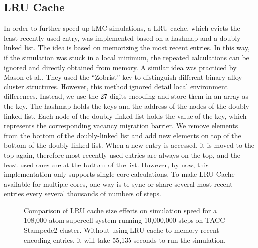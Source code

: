 \subsection{\acf{LRU} Cache}
\label{Chap:Al/Vac:sec:LRU}
In order to further speed up \ac{kMC} simulations, a \acf{LRU} cache, which evicts the least recently used entry, was implemented based on a hashmap and a  doubly-linked list. The idea is based on memorizing the most recent entries. In this way, if the simulation was stuck in a local minimum, the repeated calculations can be ignored and directly obtained from memory. A similar idea was practiced by Mason et al.\cite{mason2005fast}. They used the ``Zobrist'' key to distinguish different binary alloy cluster structures. However, this method ignored detail local environment differences. Instead, we use the 27-digits encoding and store them in an array as the key. The hashmap holds the keys and the address of the nodes of the doubly-linked list. Each node of the doubly-linked list holds the value of the key, which represents the corresponding vacancy migration barrier. We remove elements from the bottom of the doubly-linked list and add new elements on top of the bottom of the doubly-linked list. When a new entry is accessed, it is moved to the top again, therefore most recently used entries are always on the top, and the least used ones are at the bottom of the list. However, by now, this implementation only supports single-core calculations. To make \ac{LRU} Cache available for multiple cores, one way is to sync or share several most recent entries every several thousands of numbers of steps.

\begingroup
\begin{figure}[!ht]
  \centering
\caption[Comparison of \acs{LRU} cache size effects on simulation speed for a 108,000-atom supercell system running 10,000,000 steps on TACC Stampede2 cluster.]{Comparison of \acs{LRU} cache size effects on simulation speed for a 108,000-atom supercell system running 10,000,000 steps on TACC Stampede2 cluster. Without using \ac{LRU} cache to memory recent encoding entries, it will take 55,135 seconds to run the simulation.}
\label{Chap:Al/Vac:fig:lru_size}
\end{figure}
\endgroup


